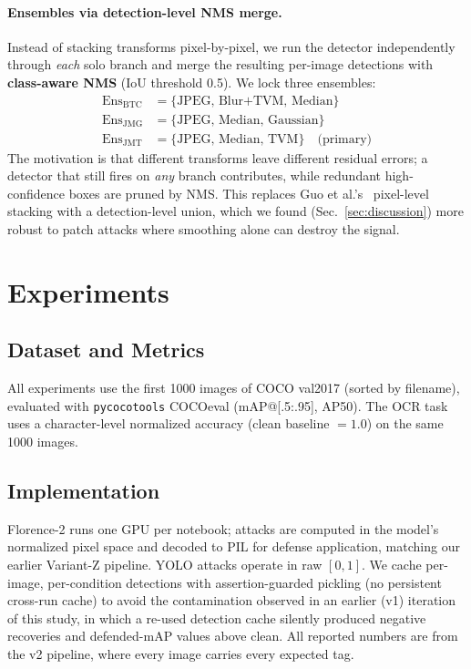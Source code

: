 \documentclass[10pt,twocolumn,letterpaper]{article}
\begin{document}
\paragraph{Ensembles via detection-level NMS merge.}
Instead of stacking transforms pixel-by-pixel, we run the detector independently through \emph{each} solo branch and merge the resulting per-image detections with \textbf{class-aware NMS} (IoU threshold 0.5). We lock three ensembles:
\begin{align*}
\mathrm{Ens}_{\text{BTC}} &= \{\text{JPEG, Blur+TVM, Median}\}\\
\mathrm{Ens}_{\text{JMG}} &= \{\text{JPEG, Median, Gaussian}\}\\
\mathrm{Ens}_{\text{JMT}} &= \{\text{JPEG, Median, TVM}\}\quad\text{(primary)}
\end{align*}
The motivation is that different transforms leave different residual errors; a detector that still fires on \emph{any} branch contributes, while redundant high-confidence boxes are pruned by NMS. This replaces Guo et al.'s~\cite{guo2018countering} pixel-level stacking with a detection-level union, which we found (Sec.~\ref{sec:discussion}) more robust to patch attacks where smoothing alone can destroy the signal.

\section{Experiments}

\subsection{Dataset and Metrics}
All experiments use the first 1000 images of COCO val2017 (sorted by filename), evaluated with \texttt{pycocotools} COCOeval (mAP@[.5:.95], AP50). The OCR task uses a character-level normalized accuracy (clean baseline $=1.0$) on the same 1000 images.

\subsection{Implementation}
Florence-2 runs one GPU per notebook; attacks are computed in the model's normalized pixel space and decoded to PIL for defense application, matching our earlier Variant-Z pipeline. YOLO attacks operate in raw $[0,1]$. We cache per-image, per-condition detections with assertion-guarded pickling (no persistent cross-run cache) to avoid the contamination observed in an earlier (v1) iteration of this study, in which a re-used detection cache silently produced negative recoveries and defended-mAP values above clean. All reported numbers are from the v2 pipeline, where every image carries every expected tag.
\end{document}
